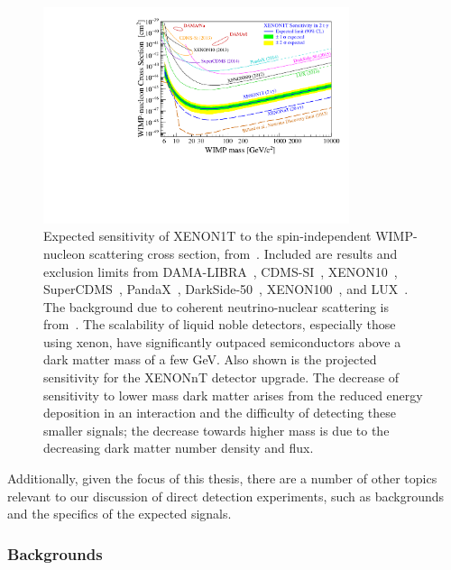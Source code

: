 \begin{figure}[htb]
    \centering
    \includegraphics[width=0.8\textwidth]{figures/dm/limit_plot}
    \caption{Expected sensitivity of XENON1T to the spin-independent WIMP-nucleon scattering cross section, from~\cite{Aprile:2015uzo}. Included are results and exclusion limits from DAMA-LIBRA~\cite{Savage:2008er}, CDMS-SI~\cite{Agnese:2013rvf}, XENON10~\cite{Angle:2013}, SuperCDMS~\cite{Agnese:2014aze}, PandaX~\cite{Xiao:2014}, DarkSide-50~\cite{Agnes:2015ftt}, XENON100~\cite{Aprile:2012nq}, and LUX~\cite{Akerib:2015rjg}. The background due to coherent neutrino-nuclear scattering is from~\cite{Billard:2013qya}. The scalability of liquid noble detectors, especially those using xenon, have significantly outpaced semiconductors above a dark matter mass of a few GeV. Also shown is the projected sensitivity for the XENONnT detector upgrade. The decrease of sensitivity to lower mass dark matter arises from the reduced energy deposition in an interaction and the difficulty of detecting these smaller signals; the decrease towards higher mass is due to the decreasing dark matter number density and flux.}\label{fig:limits}
\end{figure}

Additionally, given the focus of this thesis, there are a number of other topics relevant to our discussion of direct detection experiments, such as backgrounds and the specifics of the expected signals.

\subsubsection{Backgrounds}

